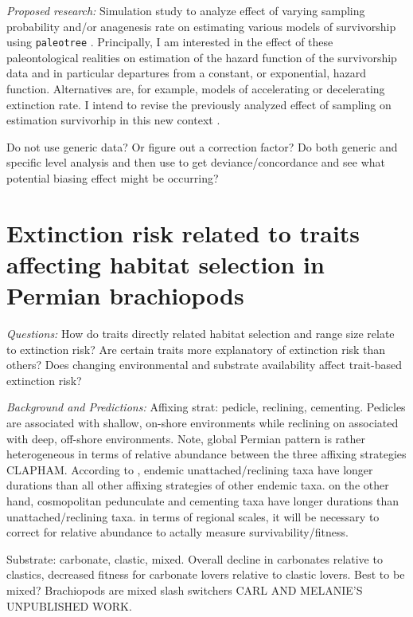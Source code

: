 \documentclass[12pt,letterpaper]{article}
\begin{document}
\textit{Proposed research:}
Simulation study to analyze effect of varying sampling probability and/or anagenesis rate on estimating various models of survivorship using \texttt{paleotree} \citep{Bapst2012a}. Principally, I am interested in the effect of these paleontological realities on estimation of the hazard function of the survivorship data and in particular departures from a constant, or exponential, hazard function. Alternatives are, for example, models of accelerating or decelerating extinction rate. I intend to revise the previously analyzed effect of sampling on estimation survivorhip in this new context \citep{Sepkoski1975}.

Do not use generic data? Or figure out a correction factor? Do both generic and specific level analysis and then use \citep{Foote1988} to get deviance/concordance and see what potential biasing effect might be occurring?


\section{Extinction risk related to traits affecting habitat selection in Permian brachiopods}

\textit{Questions:} How do traits directly related habitat selection and range size relate to extinction risk? Are certain traits more explanatory of extinction risk than others? Does changing environmental and substrate availability affect trait-based extinction risk?

\textit{Background and Predictions:}
Affixing strat: pedicle, reclining, cementing. Pedicles are associated with shallow, on-shore environments while reclining on associated with deep, off-shore environments. Note, global Permian pattern is rather heterogeneous in terms of relative abundance between the three affixing strategies CLAPHAM. According to \citet{Alexander1977}, endemic unattached/reclining taxa have longer durations than all other affixing strategies of other endemic taxa. on the other hand, cosmopolitan pedunculate and cementing taxa have longer durations than unattached/reclining taxa. in terms of regional scales, it will be necessary to correct for relative abundance to actally measure survivability/fitness.

Substrate: carbonate, clastic, mixed. Overall decline in carbonates relative to clastics, decreased fitness for carbonate lovers relative to clastic lovers. Best to be mixed? Brachiopods are mixed slash switchers CARL AND MELANIE'S UNPUBLISHED WORK.
\end{document}
